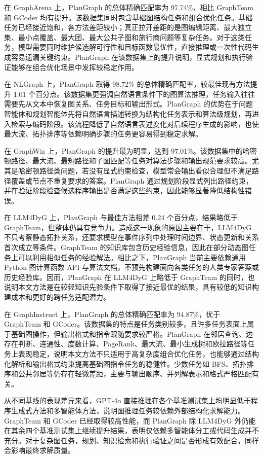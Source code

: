 在 GraphArena 上，PlanGraph 的总体精确匹配率为 97.74\%，相比 GraphTeam 和 GCoder 均有提升。该数据集同时包含基础图结构任务和组合优化任务。基础任务已经接近饱和，各方法差距较小；真正拉开差距的是图编辑距离、最大独立集、最小点覆盖、最大团、最大公共子图和旅行商问题等复杂任务。对于这类任务，模型需要同时维护候选解可行性和目标函数最优性，直接推理或一次性代码生成容易遗漏关键约束。PlanGraph 在该数据集上的提升说明，显式规划和执行验证能够在组合优化场景中发挥较稳定作用。

在 NLGraph 上，PlanGraph 取得 98.72\% 的总体精确匹配率，较最佳现有方法提升 1.01 个百分点。该数据集更强调自然语言条件下的图算法推理，任务输入往往需要先从文本中恢复图关系、任务目标和输出形式。PlanGraph 的优势在于问题智能体和规划智能体先将自然语言描述转换为结构化任务表示和算法级规划，再进入检索与编码阶段。该流程降低了自然语言表述变化对后续程序生成的影响，也使最大流、拓扑排序等依赖明确步骤的任务更容易得到稳定求解。

在 GraphWiz 上，PlanGraph 的提升最为明显，达到 97.01\%。该数据集中的哈密顿路径、最大流、最短路径和子图匹配等任务对算法步骤和输出规范要求较高。尤其是哈密顿路径类问题，若没有显式约束检查，模型常会输出看似合理但不满足路径覆盖或节点不重复要求的答案。PlanGraph 通过规划阶段显式列出路径约束，并在验证阶段检查候选程序输出是否满足这些约束，因此能够显著降低结构性错误。

在 LLM4DyG 上，PlanGraph 与最佳方法相差 0.24 个百分点，结果略低于 GraphTeam，但整体仍具有竞争力。造成这一现象的原因主要在于，LLM4DyG 不只考察静态拓扑关系，还要求模型在事件序列中处理时间边界、状态更新和关系首次成立等条件。GraphTeam 的知识库包含历史经验信息，因此在部分动态图任务上可以利用相似任务的经验解法。相比之下，PlanGraph 当前主要依赖通用 Python 图计算函数 API 与算法文档，不预先构建面向各类任务的人类专家答案或历史经验库。因而，PlanGraph 在 LLM4DyG 上略低于 GraphTeam 的同时，也说明本文方法是在较轻知识先验条件下取得了接近最优的结果，具有较低的知识构建成本和更好的跨任务适配潜力。

在 GraphInstruct 上，PlanGraph 的总体精确匹配率为 94.87\%，优于 GraphTeam 和 GCoder。该数据集的特点是任务类别较多，且许多任务表面上属于基础图操作，但输出格式和指令跟随要求较严格。PlanGraph 在邻居查询、边存在判断、连通性、度数计算、PageRank、最大流、最小生成树和欧拉路径等任务上表现稳定，说明本文方法不只适用于高复杂度组合优化任务，也能够通过结构化解析和输出格式约束提高基础图指令任务的稳健性。少数任务如 BFS、拓扑排序和公共邻居等仍存在轻微差距，主要与输出顺序、并列解表示和格式严格匹配有关。

从不同基线的表现差异来看，GPT-4o 直接推理在各个基准测试集上均明显低于程序生成式方法和多智能体方法，说明图推理任务较依赖外部结构化求解能力。GraphTeam 和 GCoder 已经取得较高性能，而 PlanGraph 除 LLM4DyG 外仍能在其余四个基准测试集上继续提升结果，表明仅依赖多智能体分工或代码生成并不充分。对于复杂图任务，规划、知识检索和执行验证之间是否形成有效配合，同样会影响最终求解质量。

